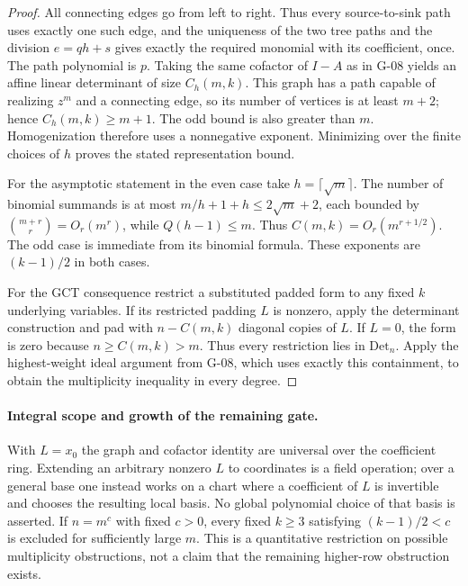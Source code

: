 \begin{proof}
All connecting edges go from left to right. Thus every source-to-sink path uses exactly one such edge, and the uniqueness of the two tree paths and the division $e=qh+s$ gives exactly the required monomial with its coefficient, once. The path polynomial is $p$. Taking the same cofactor of $I-A$ as in G-08 yields an affine linear determinant of size $C_h(m,k)$. This graph has a path capable of realizing $z^m$ and a connecting edge, so its number of vertices is at least $m+2$; hence $C_h(m,k)\geq m+1$. The odd bound is also greater than $m$. Homogenization therefore uses a nonnegative exponent. Minimizing over the finite choices of $h$ proves the stated representation bound.

For the asymptotic statement in the even case take $h=\lceil\sqrt m\rceil$. The number of binomial summands is at most $m/h+1+h\leq2\sqrt m+2$, each bounded by $\binom{m+r}{r}=O_r(m^r)$, while $Q(h-1)\leq m$. Thus $C(m,k)=O_r(m^{r+1/2})$. The odd case is immediate from its binomial formula. These exponents are $(k-1)/2$ in both cases.

For the GCT consequence restrict a substituted padded form to any fixed $k$ underlying variables. If its restricted padding $L$ is nonzero, apply the determinant construction and pad with $n-C(m,k)$ diagonal copies of $L$. If $L=0$, the form is zero because $n\geq C(m,k)>m$. Thus every restriction lies in $\mathrm{Det}_n$. Apply the highest-weight ideal argument from G-08, which uses exactly this containment, to obtain the multiplicity inequality in every degree.
\end{proof}
\paragraph{Integral scope and growth of the remaining gate.}
With $L=x_0$ the graph and cofactor identity are universal over the coefficient ring. Extending an arbitrary nonzero $L$ to coordinates is a field operation; over a general base one instead works on a chart where a coefficient of $L$ is invertible and chooses the resulting local basis. No global polynomial choice of that basis is asserted. If $n=m^c$ with fixed $c>0$, every fixed $k\geq3$ satisfying $(k-1)/2<c$ is excluded for sufficiently large $m$. This is a quantitative restriction on possible multiplicity obstructions, not a claim that the remaining higher-row obstruction exists.
